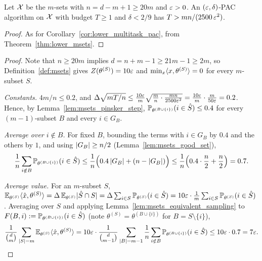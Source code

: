 \begin{corollary}\label{cor:lower_msets_pac}
\leanok
{}
Let $\mathcal{X}$ be the $m$-sets with $n = d - m + 1 \ge 20m$ and $\varepsilon > 0$. An $(\varepsilon,\delta)$-PAC
algorithm on $\mathcal{X}$ with budget $T \ge 1$ and $\delta < 2/9$ has $T > mn/(2500\,\varepsilon^2)$.
\end{corollary}
\begin{proof}
\leanok
{}
As for Corollary~\ref{cor:lower_multitask_pac}, from Theorem~\ref{thm:lower_msets}.
\end{proof}

\begin{proof}
\leanok
{}
Note that $n \ge 20m$ implies $d = n + m - 1 \ge 21m - 1 \ge 2m$, so
Definition~\ref{def:msets} gives $Z(\theta^{(S)}) = 10\varepsilon$ and
$\min_x\langle x, \theta^{(S)} \rangle = 0$ for every $m$-subset $S$.

\emph{Constants.} $4m/n \le 0.2$, and
$\Delta\sqrt{mT/n} \le \frac{10\varepsilon}{m}\sqrt{\frac{m}{n}\cdot\frac{mn}{2500\varepsilon^2}} = \frac{10\varepsilon}{m}\cdot\frac{m}{50\varepsilon} = 0.2$.
Hence, by Lemma~\ref{lem:msets_pinsker_step}, $\mathbb{P}_{\theta^{(B\cup\{i\})}}(i\in\hat S) \le 0.4$
for every $(m-1)$-subset $B$ and every $i \in G_B$.

\emph{Average over $i \notin B$.} For fixed $B$, bounding the terms with $i \in G_B$ by
$0.4$ and the others by $1$, and using $\lvert G_B \rvert \ge n/2$ (Lemma~\ref{lem:msets_good_set}),
\[
  \frac1n\sum_{i\notin B}\mathbb{P}_{\theta^{(B\cup\{i\})}}(i \in \hat S)
  \le \frac1n\Big(0.4\,\lvert G_B \rvert + (n - \lvert G_B \rvert)\Big) \le \frac1n\Big(0.4\cdot\frac n2 + \frac n2\Big) = 0.7 .
\]

\emph{Average value.} For an $m$-subset $S$,
$\mathbb{E}_{\theta^{(S)}}\langle \hat{x}, \theta^{(S)} \rangle = \Delta\,\mathbb{E}_{\theta^{(S)}}\lvert \hat S\cap S \rvert
= \Delta\sum_{i\in S}\mathbb{P}_{\theta^{(S)}}(i\in\hat S) = 10\varepsilon\cdot\frac1m\sum_{i\in S}\mathbb{P}_{\theta^{(S)}}(i\in\hat S)$.
Averaging over $S$ and applying Lemma~\ref{lem:msets_equivalent_sampling} to
$F(B,i) := \mathbb{P}_{\theta^{(B\cup\{i\})}}(i\in\hat S)$ (note $\theta^{(S)} = \theta^{(B\cup\{i\})}$ for
$B = S\setminus\{i\}$),
\[
  \frac{1}{\binom dm}\sum_{\lvert S \rvert = m}\mathbb{E}_{\theta^{(S)}}\langle \hat{x}, \theta^{(S)} \rangle
  = 10\varepsilon\cdot\frac{1}{\binom{d}{m-1}}\sum_{\lvert B \rvert = m-1}\frac1n\sum_{i\notin B}\mathbb{P}_{\theta^{(B\cup\{i\})}}(i\in\hat S)
  \le 10\varepsilon\cdot 0.7 = 7\varepsilon .
\]


\end{proof}

